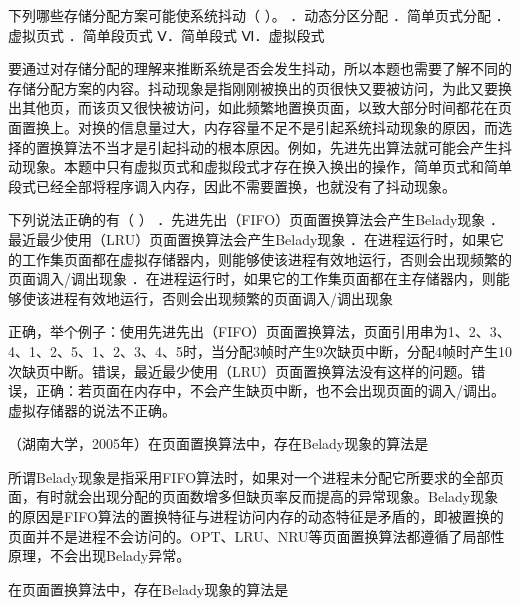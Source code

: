 \question 下列哪些存储分配方案可能使系统抖动（ ）。 ．动态分区分配
．简单页式分配 ．虚拟页式 ．简单段页式 Ⅴ．简单段式 Ⅵ．虚拟段式
\par{}
\begin{solution}要通过对存储分配的理解来推断系统是否会发生抖动，所以本题也需要了解不同的存储分配方案的内容。抖动现象是指刚刚被换出的页很快又要被访问，为此又要换出其他页，而该页又很快被访问，如此频繁地置换页面，以致大部分时间都花在页面置换上。对换的信息量过大，内存容量不足不是引起系统抖动现象的原因，而选择的置换算法不当才是引起抖动的根本原因。例如，先进先出算法就可能会产生抖动现象。本题中只有虚拟页式和虚拟段式才存在换入换出的操作，简单页式和简单段式已经全部将程序调入内存，因此不需要置换，也就没有了抖动现象。
\end{solution}
\question 下列说法正确的有（ ） ．先进先出（FIFO）页面置换算法会产生Belady现象
．最近最少使用（LRU）页面置换算法会产生Belady现象
．在进程运行时，如果它的工作集页面都在虚拟存储器内，则能够使该进程有效地运行，否则会出现频繁的页面调入/调出现象
．在进程运行时，如果它的工作集页面都在主存储器内，则能够使该进程有效地运行，否则会出现频繁的页面调入/调出现象
\par{}
\begin{solution}正确，举个例子：使用先进先出（FIFO）页面置换算法，页面引用串为1、2、3、4、1、2、5、1、2、3、4、5时，当分配3帧时产生9次缺页中断，分配4帧时产生10次缺页中断。错误，最近最少使用（LRU）页面置换算法没有这样的问题。错误，正确：若页面在内存中，不会产生缺页中断，也不会出现页面的调入/调出。虚拟存储器的说法不正确。
\end{solution}
\question （湖南大学，2005年）在页面置换算法中，存在Belady现象的算法是
\par{}
\begin{solution}所谓Belady现象是指采用FIFO算法时，如果对一个进程未分配它所要求的全部页面，有时就会出现分配的页面数增多但缺页率反而提高的异常现象。Belady现象的原因是FIFO算法的置换特征与进程访问内存的动态特征是矛盾的，即被置换的页面并不是进程不会访问的。OPT、LRU、NRU等页面置换算法都遵循了局部性原理，不会出现Belady异常。
\end{solution}
\question 在页面置换算法中，存在Belady现象的算法是
